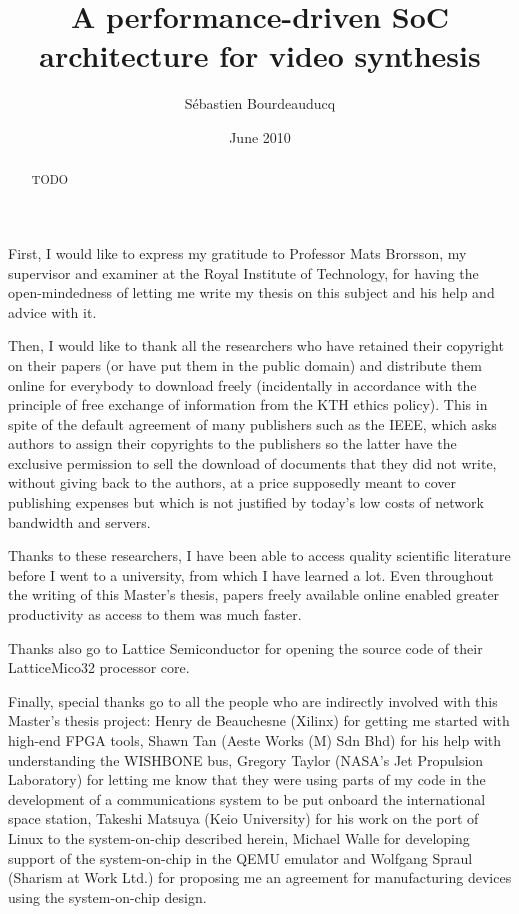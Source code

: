 \documentclass[a4paper,11pt]{kthesis}
\title{A performance-driven SoC architecture for video synthesis}
\date{June 2010}
\author{S\'ebastien Bourdeauducq}
\begin{document}
\begin{abstract}
TODO
\end{abstract}

\begin{acknowledgments}
First, I would like to express my gratitude to Professor Mats Brorsson, my supervisor and examiner at the Royal Institute of Technology, for having the open-mindedness of letting me write my thesis on this subject and his help and advice with it.

Then, I would like to thank all the researchers who have retained their copyright on their papers (or have put them in the public domain) and distribute them online for everybody to download freely (incidentally in accordance with the principle of free exchange of information from the KTH ethics policy). This in spite of the default agreement of many publishers such as the IEEE, which asks authors to assign their copyrights to the publishers so the latter have the exclusive permission to sell the download of documents that they did not write, without giving back to the authors, at a price supposedly meant to cover publishing expenses but which is not justified by today's low costs of network bandwidth and servers.

Thanks to these researchers, I have been able to access quality scientific literature before I went to a university, from which I have learned a lot. Even throughout the writing of this Master's thesis, papers freely available online enabled greater productivity as access to them was much faster.

Thanks also go to Lattice Semiconductor for opening the source code of their LatticeMico32 processor core.

Finally, special thanks go to all the people who are indirectly involved with this Master's thesis project: Henry de Beauchesne (Xilinx) for getting me started with high-end FPGA tools, Shawn Tan (Aeste Works (M) Sdn Bhd) for his help with understanding the WISHBONE bus, Gregory Taylor (NASA's Jet Propulsion Laboratory) for letting me know that they were using parts of my code in the development of a communications system to be put onboard the international space station, Takeshi Matsuya (Keio University) for his work on the port of Linux to the system-on-chip described herein, Michael Walle for developing support of the system-on-chip in the QEMU emulator and Wolfgang Spraul (Sharism at Work Ltd.) for proposing me an agreement for manufacturing devices using the system-on-chip design.
\end{acknowledgments}
\end{document}
